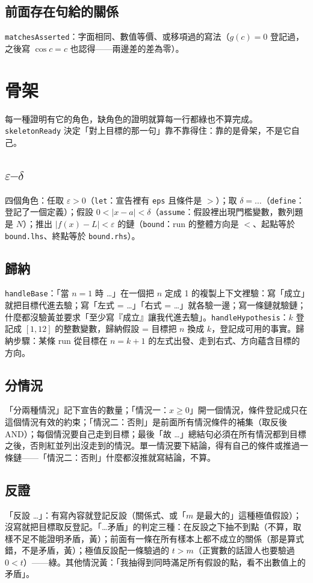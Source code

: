\documentclass[11pt,a4paper,oneside]{book}
\renewcommand{\_}{\ifmmode\origunderscore\else\textunderscore\allowbreak\fi}
\newcommand{\code}[1]{\texttt{#1}}
\begin{document}
\section{前面存在句給的關係}
\code{matchesAsserted}：字面相同、數值等價、或移項過的寫法（$g(c) = 0$ 登記過，之後寫 $\cos c = c$ 也認得——兩邊差的差為零）。

\chapter{骨架}
每一種證明有它的角色，缺角色的證明就算每一行都綠也不算完成。\code{skeletonReady} 決定「對上目標的那一句」靠不靠得住：靠的是骨架，不是它自己。

\section{$\varepsilon$–$\delta$}
四個角色：任取 $\varepsilon > 0$（\code{let}：宣告裡有 \code{eps} 且條件是 $>$）；取 $\delta = \ldots$（\code{define}：登記了一個定義）；假設 $0 < |x - a| < \delta$（\code{assume}：假設裡出現門檻變數，數列題是 $N$）；推出 $|f(x) - L| < \varepsilon$ 的鏈（\code{bound}：run 的整體方向是 $<$、起點等於 \code{bound.lhs}、終點等於 \code{bound.rhs}）。

\section{歸納}
\code{handleBase}：「當 $n = 1$ 時 …」在一個把 $n$ 定成 1 的複製上下文裡驗：寫「成立」就把目標代進去驗；寫「左式 = …」「右式 = …」就各驗一邊；寫一條鏈就驗鏈；什麼都沒驗黃並要求「至少寫『成立』讓我代進去驗」。\code{handleHypothesis}：$k$ 登記成 $[1, 12]$ 的整數變數，歸納假設 = 目標把 $n$ 換成 $k$，登記成可用的事實。歸納步驟：某條 run 從目標在 $n = k+1$ 的左式出發、走到右式、方向蘊含目標的方向。

\section{分情況}
「分兩種情況」記下宣告的數量；「情況一：$x \ge 0$」開一個情況，條件登記成只在這個情況有效的約束；「情況二：否則」是前面所有情況條件的補集（取反後 AND）；每個情況要自己走到目標；最後「故 …」總結句必須在所有情況都到目標之後，否則紅並列出沒走到的情況。單一情況要下結論，得有自己的條件或推過一條鏈——「情況二：否則」什麼都沒推就寫結論，不算。

\section{反證}
「反設 …」：有寫內容就登記反設（關係式、或「$m$ 是最大的」這種極值假設）；沒寫就把目標取反登記。「…矛盾」的判定三種：在反設之下抽不到點（不算，取樣不足不能證明矛盾，黃）；前面有一條在所有樣本上都不成立的關係（那是算式錯，不是矛盾，黃）；極值反設配一條驗過的 $t > m$（正實數的話證人也要驗過 $0 < t$）——綠。其他情況黃：「我抽得到同時滿足所有假設的點，看不出數值上的矛盾」。
\end{document}
